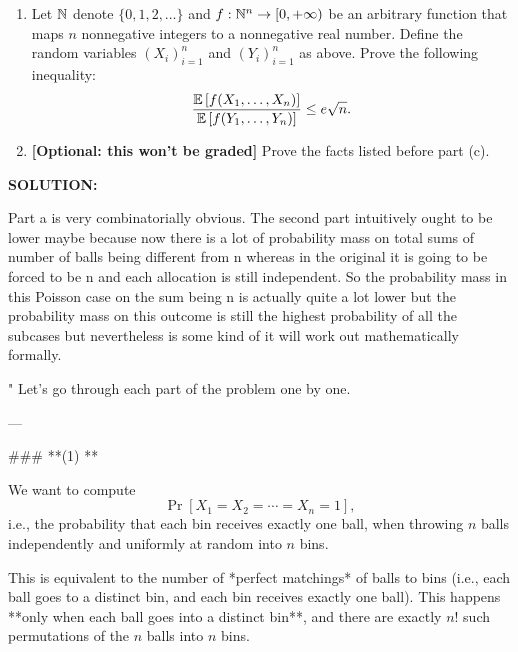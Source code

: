 \begin{enumerate}
\begin{enumerate}[start=3]
\item {} Let $\mathbb{N}$ denote $\{0, 1, 2,\ldots \}$ and $f: \mathbb{N}^n \to [0, +\infty)$ be an arbitrary function that maps $n$ nonnegative integers to a nonnegative real number. Define the random variables $(X_i)_{i=1}^{n}$ and $(Y_i)_{i=1}^{n}$ as above. Prove the following inequality:
\begin{equation}\label{eq:p3-general}
    \frac{\operatorname*{\mathbb{E}}\left[f(X_1, \ldots, X_n)\right]}{\operatorname*{\mathbb{E}}\left[f(Y_1, \ldots, Y_n)\right]}
\le e\sqrt{n}.
\end{equation}


\item {} \textbf{[Optional: this won't be graded]} Prove the facts listed before part (c).
\end{enumerate}

\ifdefined\template
\begin{shaded}
\textbf{SOLUTION:}
\ifdefined\sol


Part a is very combinatorially obvious. The second part intuitively ought to be lower maybe because now there is a lot of probability mass on total sums of number of balls being different from n whereas in the original it is going to be forced to be n and each allocation is still independent. So the probability mass in this Poisson case on the sum being n is actually quite a lot lower but the probability mass on this outcome is still the highest probability of all the subcases but nevertheless is some kind of it will work out mathematically formally.

"
Let's go through each part of the problem one by one.

---

### **(1) **

We want to compute  
\[
\Pr[X_1 = X_2 = \cdots = X_n = 1],
\]
i.e., the probability that each bin receives exactly one ball, when throwing \( n \) balls independently and uniformly at random into \( n \) bins.

This is equivalent to the number of *perfect matchings* of balls to bins (i.e., each ball goes to a distinct bin, and each bin receives exactly one ball). This happens **only when each ball goes into a distinct bin**, and there are exactly \( n! \) such permutations of the \( n \) balls into \( n \) bins.


\end{shaded}
\end{enumerate}

